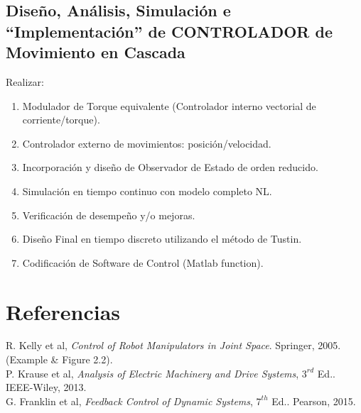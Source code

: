 \documentclass[11pt,a4paper]{article}
\begin{document}
\subsection{Diseño, Análisis, Simulación e ``Implementación'' de CONTROLADOR de Movimiento en Cascada}
Realizar:
\begin{enumerate}
    \item Modulador de Torque equivalente (Controlador interno vectorial de corriente/torque).
    \item Controlador externo de movimientos: posición/velocidad.
    \item Incorporación y diseño de Observador de Estado de orden reducido.
    \item Simulación en tiempo continuo con modelo completo NL.
    \item Verificación de desempeño y/o mejoras.
    \item Diseño Final en tiempo discreto utilizando el método de Tustin.
    \item Codificación de Software de Control (Matlab function).
\end{enumerate}

\section{Referencias}
\noindent [1] R. Kelly et al, \textit{Control of Robot Manipulators in Joint Space}. Springer, 2005. (Example \& Figure 2.2). \\
\noindent [2] P. Krause et al, \textit{Analysis of Electric Machinery and Drive Systems}, $3^{rd}$ Ed.. IEEE-Wiley, 2013. \\
\noindent [3] G. Franklin et al, \textit{Feedback Control of Dynamic Systems}, $7^{th}$ Ed.. Pearson, 2015.
\end{document}
